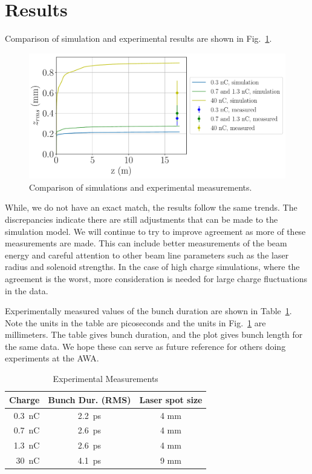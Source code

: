 \documentclass[letterpaper,  %
              ]{jacow-2_3}   %
\begin{document}
\section{Results}
Comparison of simulation and experimental results are shown in Fig.~\ref{sims}.
\begin{figure}[!tbh]
	\centering
	\includegraphics[width=0.8\linewidth]{images/THPMF048f5}
	\caption{Comparison of simulations and experimental measurements.}
	\label{sims}
\end{figure}
While, we do not have an exact match, the results follow the same trends.
The discrepancies indicate there are still adjustments that can be made
to the simulation model. We will continue to try to improve agreement
as more of these measurements are made. 
This can include better measurements of the beam energy and careful attention to other 
beam line parameters such as the laser radius and solenoid strengths.
In the case of high charge simulations, where the agreement is the worst, 
more consideration is needed for large charge fluctuations in the data.

Experimentally measured values of the bunch duration are shown in Table~\ref{exp}.
Note the units in the table are picoseconds and the units in Fig.~\ref{sims} are millimeters.
The table gives bunch duration, and the plot gives bunch length for the same data.
We hope these can serve as future reference for others doing experiments at the AWA.
\begin{table}[h]
	\centering
	\caption{Experimental Measurements}
	\begin{tabular}{rcc}
		\toprule
		\textbf{Charge} & \textbf{Bunch Dur. (RMS)} & \textbf{Laser spot size}  \\
		\midrule
		\SI{0.3}{nC} & \SI{2.2}{ps} & 4 mm    \\ %
		\SI{0.7}{nC} & \SI{2.6}{ps} & 4 mm   \\ %
		\SI{1.3}{nC} & \SI{2.6}{ps} & 4 mm    \\
		\SI{30}{nC}  & \SI{4.1}{ps} & 9 mm \\ %
		\bottomrule
	\end{tabular}
	\label{exp}
\end{table}
\end{document}
